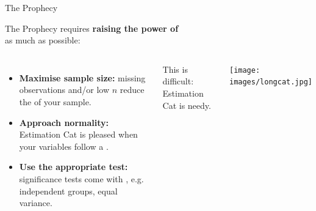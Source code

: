 \documentclass{beamer}
\begin{document}
	\begin{frame}[t]{The Prophecy}

	The Prophecy requires \textbf{raising the power of }\\as much as possible:
	
	\begin{columns}[T]
		\begin{itemize}
 			\item \textbf{Maximise sample size:} missing observations and/or low $n$ reduce the  of your sample.

 			\item \textbf{Approach normality:} Estimation Cat is pleased when your variables follow a .

 			\item \textbf{Use the appropriate test:} significance tests come with , e.g. independent groups, equal variance.
		\end{itemize}

	This is difficult: Estimation Cat is needy.	

	\vspace{0em}
	\begin{flushright}
	\texttt{[image: images/longcat.jpg]}		
	\end{flushright}
	\end{columns}
		
	\end{frame}

\end{document}

